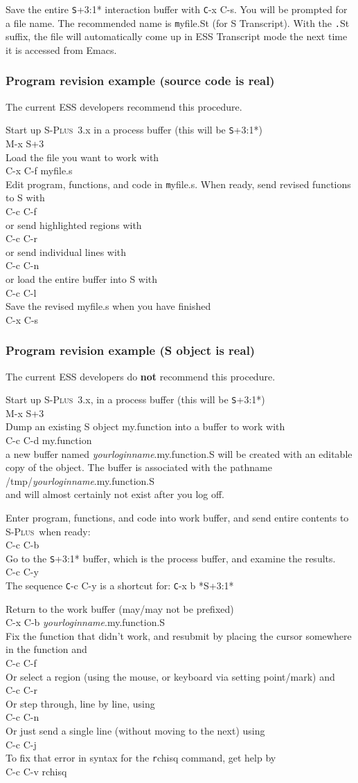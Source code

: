 \documentclass{article}
\newcommand*{\Splus}{\textsc{S-Plus}}
\newcommand{\elcode}[1]{\\{\texttt\hspace*{2em} #1}\\}
\begin{document}
Save the entire {\texttt *S+3:1*} interaction buffer with {\texttt C-x C-s}.  You
will be prompted for a file name.  The recommended name is
{\texttt myfile.St} (for S Transcript).  With the {\texttt *.St} suffix,
the file will automatically come up in ESS
Transcript mode the next time it is accessed from Emacs.


\subsubsection{Program revision example (source code is real)}
The current ESS developers recommend this procedure.

\noindent
Start up \Splus~3.x in a process buffer (this will be {\texttt *S+3:1*})
  \elcode{M-x S+3}
Load the file you want to work with
  \elcode{C-x C-f myfile.s}
Edit program, functions, and code in {\texttt myfile.s}.
When ready, send revised functions to S with
  \elcode{C-c C-f}
or send highlighted regions with
  \elcode{C-c C-r}
or send individual lines with
  \elcode{C-c C-n}
or load the entire buffer into S with
  \elcode{C-c C-l}
Save the revised myfile.s when you have finished
  \elcode{C-x C-s}

\subsubsection{Program revision example (S object is real)}
The current ESS developers do {\bf not} recommend this procedure.

\noindent
Start up \Splus~3.x, in a process buffer (this will be {\texttt *S+3:1*}) 
  \elcode{M-x S+3}
Dump an existing S object my.function into a buffer to work with
  \elcode{C-c C-d my.function}
a new buffer named \textit{yourloginname}.my.function.S will be created with
an editable copy of the object.  The buffer is associated with the
pathname
 \elcode{/tmp/\textit{yourloginname}.my.function.S}
and will almost certainly not exist after you log off.

Enter program, functions, and code into work buffer,
and send entire contents to \Splus\ when ready:
  \elcode{C-c C-b}
Go to the {\texttt *S+3:1*} buffer, which is the process buffer, and examine
the results.
  \elcode{C-c C-y}
The sequence {\texttt C-c C-y} is a shortcut for:  {\texttt C-x b *S+3:1*}

Return to the work buffer (may/may not be prefixed)
  \elcode{C-x C-b \textit{yourloginname}.my.function.S}
Fix the function that didn't work, and resubmit by
placing the cursor somewhere in the function and
  \elcode{C-c C-f}
Or select a region (using the mouse, or keyboard
via setting point/mark) and
  \elcode{C-c C-r}
Or step through, line by line, using
  \elcode{C-c C-n}
Or just send a single line (without moving to the next) using
  \elcode{C-c C-j}
To fix that error in syntax for the {\texttt rchisq} command, get help
by
  \elcode{C-c C-v rchisq}
\end{document}
